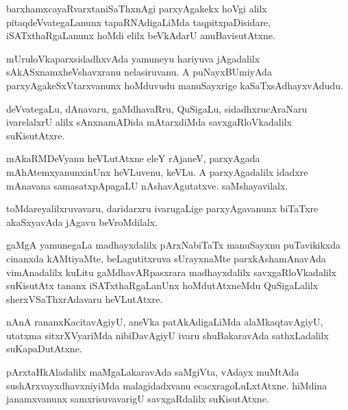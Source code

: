 \documentclass{article}
\begin{document}
\begin{mn}
barxhamxcayaRvarxtaniSaThxnAgi parxyAgakekx hoVgi alilx pitaqdeVvategaLanunx tapaRNAdigaLiMda 
taqpitxpaDisidare, iSATxthaRgaLanunx  hoMdi elilx beVkAdarU anuBavisutAtxne.
\end{mn}

\begin{mn}
mUruloVkaparxsidadhxvAda yamuneyu hariyuva jAgadalilx sAkASxnamxheVshavxranu nelasiruvanu. A 
puNayxBUmiyAda  parxyAgakeSxVtarxvanunx hoMduvudu manuSayxrige kaSaTxsAdhayxvAdudu.
\end{mn}

\begin{mn}
deVvategaLu, dAnavaru, gaMdhavaRru, QuSigaLu, sidadhxrucAraNaru ivarelalxrU alilx sAnxnamADida 
mAtarxdiMda savxgaRloVkadalilx suKisutAtxre.
\end{mn}


\begin{mn}
mAkaRMDeVyanu heVLutAtxne eleY rAjaneV, parxyAgada mAhAtemxyanunxinUnx heVLuvenu, keVLu. A 
parxyAgadalilx idadxre mAnavana samasatxpApagaLU nAshavAgutatxve. saMshayavilalx.
\end{mn}

\begin{mn}
toMdareyalilxruvavaru, daridarxru ivarugaLige parxyAgavanunx biTaTxre akaSxyavAda jAgavu 
beVroMdilalx.
\end{mn}

\begin{mn}
gaMgA yamunegaLa madhayxdalilx pArxNabiTaTx manuSayxnu puTavikikxda cinanxda kAMtiyaMte, 
beLagutitxruva sUrayxnaMte parxkAshamAnavAda vimAnadalilx kuLitu gaMdhavARpasxrara madhayxdalilx 
savxgaRloVkadalilx suKisutAtx tananx iSATxthaRgaLanUnx hoMdutAtxneMdu QuSigaLalilx 
sherxVSaThxrAdavaru heVLutAtxre.
\end{mn}

\begin{mn}
nAnA rananxKacitavAgiyU, aneVka patAkAdigaLiMda alaMkaqtavAgiyU, utatxma sitxrXVyariMda nibiDavAgiyU
ivaru shuBakaravAda sathxLadalilx  suKapaDutAtxne.
\end{mn}

\begin{mn}
pArxtaHkAladalilx maMgaLakaravAda saMgiVta, vAdayx muMtAda sushArxvayxdhavxniyiMda malagidadxvanu 
ecacxragoLuLxtAtxne. hiMdina janamxvanunx samxrisuvavarigU savxgaRdalilx suKisutAtxne.
\end{mn}
\end{document}
